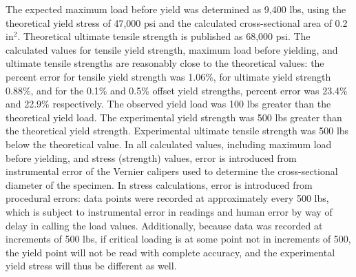 \documentclass{article}
\begin{document}
    \indent The expected maximum load before yield was determined as 9,400 lbs, using the theoretical yield stress of 47,000 psi and the calculated cross-sectional area of 0.2 \(\text{in}^2\). Theoretical ultimate tensile strength is published as 68,000 psi. The calculated values for tensile yield strength, maximum load before yielding, and ultimate tensile strengths are reasonably close to the theoretical values: the percent error for tensile yield strength was 1.06\%, for ultimate yield strength 0.88\%, and for the 0.1\% and 0.5\% offset yield strengths, percent error was 23.4\% and 22.9\% respectively. The observed yield load was 100 lbs greater than the theoretical yield load. The experimental yield strength was 500 lbs greater than the theoretical yield strength. Experimental ultimate tensile strength was 500 lbs below the theoretical value. In all calculated values, including maximum load before yielding, and stress (strength) values, error is introduced from instrumental error of the Vernier calipers used to determine the cross-sectional diameter of the specimen. In stress calculations, error is introduced from procedural errors: data points were recorded at approximately every 500 lbs, which is subject to instrumental error in readings and human error by way of delay in calling the load values. Additionally, because data was recorded at increments of 500 lbs, if critical loading is at some point not in increments of 500, the yield point will not be read with complete accuracy, and the experimental yield stress will thus be different as well.  \\
\end{document}

